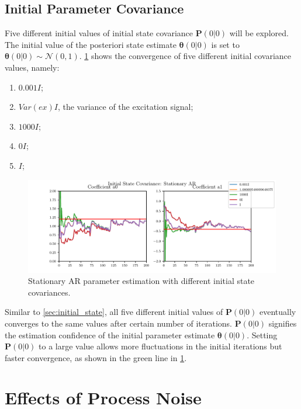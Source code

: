 \documentclass{article}
\begin{document}
\subsection{Initial Parameter Covariance}

Five different initial values of initial state covariance $\bm{P}(0|0)$ will be explored. The initial value of the posteriori state estimate $\bm{\theta}(0|0)$ is set to $\bm{\theta}(0|0) \sim \mathcal{N}(0, 1)$. \cref{fig:initial_cov_stationary} shows the convergence of five different initial covariance values, namely:
\begin{enumerate}
    \item $0.001I$;
    \item $Var(ex)I$, the variance of the excitation signal;
    \item $1000I$;
    \item $0I$;
    \item $I$;
\end{enumerate}


\begin{figure}[h!]
    \includegraphics[width=\textwidth]{Figures/initial_cov_stationary.pdf}
    \caption{Stationary AR parameter estimation with different initial state covariances.}
    \label{fig:initial_cov_stationary}
\end{figure}

Similar to \cref{sec:initial_state}, all five different initial values of $\bm{P}(0|0)$ eventually converges to the same values after certain number of iterations. $\bm{P}(0|0)$ signifies the estimation confidence of the initial parameter estimate $\bm{\theta}(0|0)$. Setting $\bm{P}(0|0)$ to a large value allows more fluctuations in the initial iterations but faster convergence, as shown in the green line in \cref{fig:initial_cov_stationary}.

\section{Effects of Process Noise}
\end{document}
